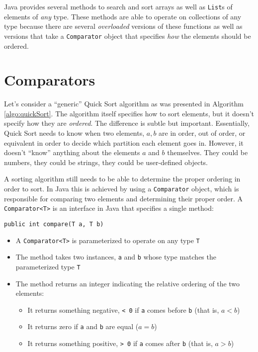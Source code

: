 

Java provides several methods to search and sort arrays as well as 
\texttt{List}s of elements of \emph{any} type.  These
methods are able to operate on collections of any type because there
are several \emph{overloaded} versions of these functions as well as
versions that take a \texttt{Comparator} object that specifies
\emph{how} the elements should be ordered.

\section{Comparators}

Let's consider a ``generic'' Quick Sort algorithm as was presented in
Algorithm \ref{algo:quickSort}.  The algorithm itself specifies how to 
sort elements, but it doesn't specify how they are \emph{ordered}.  The 
difference is subtle but important.  Essentially, Quick Sort needs to 
know when two elements, $a, b$ are in order, out of order, or equivalent 
in order to decide which partition each element goes in.  However, it 
doesn't ``know'' anything about the elements $a$ and $b$ themselves.  
They could be numbers, they could be strings, they could be user-defined 
objects.  

A sorting algorithm still needs to be able to determine the proper ordering 
in order to sort.  In Java this is achieved by using a 
\texttt{Comparator} object, which is responsible for comparing 
two elements and determining their proper order.  A \texttt{Comparator<T>}
is an interface in Java that specifies a single method: 

\texttt{public int compare(T a, T b)}

\begin{itemize}
  \item A \texttt{Comparator<T>} is parameterized to operate on any
  	type \texttt{T}
  \item The method takes two instances, \texttt{a} and \texttt{b}
    whose type matches the parameterized type \texttt{T}
  \item The method returns an integer indicating the relative ordering of
  	the two elements:
	\begin{itemize}
	  \item It returns something negative, \texttt{< 0} if 
	  \texttt{a} comes before \texttt{b} (that is, $a < b$)
	  \item It returns zero if \texttt{a} and \texttt{b} are
	  equal ($a = b$)
	  \item It returns something positive, \texttt{> 0} if 
	  \texttt{a} comes after \texttt{b} (that is, $a > b$)
	\end{itemize}
\end{itemize}

